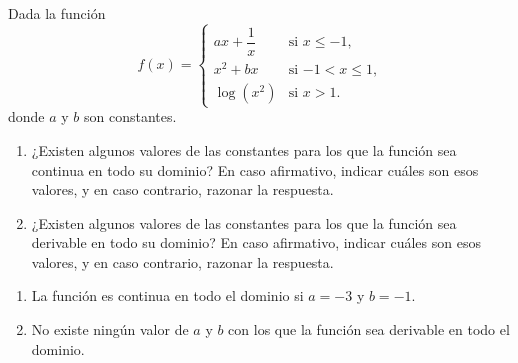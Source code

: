 {Dada la función
\[ f(x)=
\begin{cases}
ax+\dfrac{1}{x} & \mbox{si $x\leq -1$,} \\
x^2+bx & \mbox{si $-1<x\leq 1$,} \\
\log (x^2) & \mbox{si $x>1$.}
\end{cases}
\]
donde $a$ y $b$ son constantes.
\begin{enumerate}
\item  ¿Existen algunos valores de las constantes para los que la función sea continua en todo su dominio? En caso afirmativo, indicar cuáles son esos valores, y en caso contrario, razonar la respuesta.
\item  ¿Existen algunos valores de las constantes para los que la función sea derivable en todo su dominio? En caso afirmativo, indicar cuáles son esos valores, y en caso contrario, razonar la respuesta.
\end{enumerate}
}
{\begin{enumerate}
\item La función es continua en todo el dominio si $a=-3$ y $b=-1$.
\item No existe ningún valor de $a$ y $b$ con los que la función sea derivable en todo el dominio.
\end{enumerate}
}
{
}


